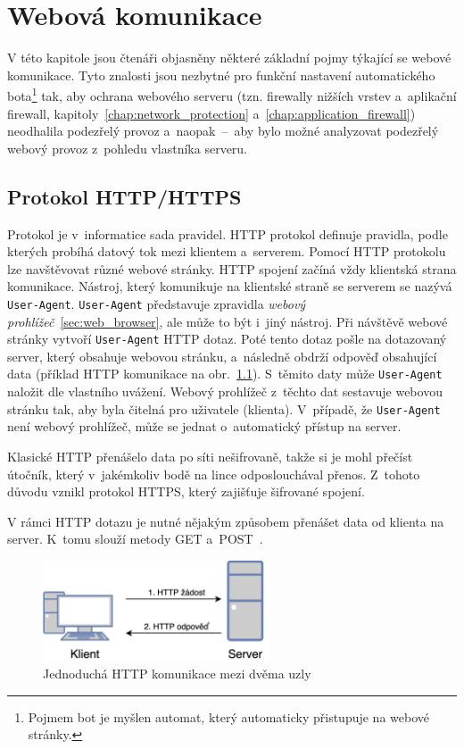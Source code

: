 \chapter{Webová komunikace}
\label{chap:web_communication}
V této kapitole jsou čtenáři objasněny některé základní pojmy týkající se webové komunikace. Tyto znalosti jsou nezbytné pro funkční nastavení automatického bota\footnote{Pojmem bot je myšlen automat, který automaticky přistupuje na webové stránky.} tak, aby ochrana webového serveru (tzn. firewally nižších vrstev a~aplikační firewall, kapitoly~\ref{chap:network_protection} a~\ref{chap:application_firewall}) neodhalila podezřelý provoz a~naopak~--~aby bylo možné analyzovat podezřelý webový provoz z~pohledu vlastníka serveru.

\section{Protokol HTTP/HTTPS}
\label{sec:http}
Protokol je v~informatice sada pravidel. HTTP protokol definuje pravidla, podle kterých probíhá datový tok mezi klientem a~serverem. Pomocí HTTP protokolu lze navštěvovat různé webové stránky. HTTP spojení začíná vždy klientská strana komunikace. Nástroj, který komunikuje na klientské straně se serverem se nazývá \texttt{User-Agent}. \texttt{User-Agent} představuje zpravidla \textit{webový prohlížeč}~\ref{sec:web_browser}, ale může to být i~jiný nástroj.
Při návštěvě webové stránky vytvoří \texttt{User-Agent} HTTP dotaz. Poté tento dotaz pošle na dotazovaný server, který obsahuje webovou stránku, a~následně obdrží odpověď obsahující data (příklad HTTP komunikace na obr.~\ref{img:HTTP_request}). S~těmito daty může \texttt{User-Agent} naložit dle vlastního uvážení. Webový prohlížeč z~těchto dat sestavuje webovou stránku tak, aby byla čitelná pro uživatele (klienta). V~případě, že \texttt{User-Agent} není webový prohlížeč, může se jednat o~automatický přístup na server.

Klasické HTTP přenášelo data po síti nešifrovaně, takže si je mohl přečíst útočník, který v~jakémkoliv bodě na lince odposlouchával přenos. Z~tohoto důvodu vznikl protokol HTTPS, který zajišťuje šifrované spojení.

V rámci HTTP dotazu je nutné nějakým způsobem přenášet data od klienta na server. K~tomu slouží metody GET a~POST~\cite{bib:httpRFC}. 

\begin{figure}[hbt]
	\centering
	\includegraphics[width=0.6\textwidth]{images/HTTP_request.png}
	\caption{Jednoduchá HTTP komunikace mezi dvěma uzly}
	\label{img:HTTP_request}
\end{figure}

